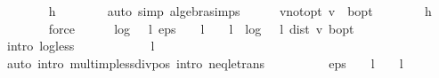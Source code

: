 \begin{isabellebody}
\ \ \ \ \ \ \isamarkupfalse%
\ h\isanewline
\ \ \ \ \ \ \isamarkupfalse%
\ {\isacharparenleft}{\kern0pt}auto\ simp{\isacharcolon}{\kern0pt}\ algebra{\isacharunderscore}{\kern0pt}simps{\isacharparenright}{\kern0pt}\isanewline
\ \ \ \ \isamarkupfalse%
\ v{\isacharunderscore}{\kern0pt}not{\isacharunderscore}{\kern0pt}opt{\isacharcolon}{\kern0pt}\ {\isachardoublequoteopen}v\ {\isasymnoteq}\ {\isasymnu}\isactrlsub b{\isacharunderscore}{\kern0pt}opt{\isachardoublequoteclose}\isanewline
\ \ \ \ \ \ \isamarkupfalse%
\ h\isanewline
\ \ \ \ \ \ \isamarkupfalse%
\ force\isanewline
\ \ \ \ \isamarkupfalse%
\ {\isachardoublequoteopen}log\ {\isacharparenleft}{\kern0pt}{}\ {\isacharslash}{\kern0pt}\ l{\isacharparenright}{\kern0pt}\ {\isacharparenleft}{\kern0pt}eps\ {\isacharasterisk}{\kern0pt}\ {\isacharparenleft}{\kern0pt}{}\ {\isacharminus}{\kern0pt}\ l{\isacharparenright}{\kern0pt}\ {\isacharslash}{\kern0pt}\ {\isacharparenleft}{\kern0pt}{}\ {\isacharasterisk}{\kern0pt}\ l{\isacharparenright}{\kern0pt}{\isacharparenright}{\kern0pt}\ {\isacharless}{\kern0pt}\ log\ {\isacharparenleft}{\kern0pt}{}\ {\isacharslash}{\kern0pt}\ l{\isacharparenright}{\kern0pt}\ {\isacharparenleft}{\kern0pt}dist\ v\ {\isasymnu}\isactrlsub b{\isacharunderscore}{\kern0pt}opt{\isacharparenright}{\kern0pt}{\isachardoublequoteclose}\isanewline
\ \ \ \ \isamarkupfalse%
\ {\isacharparenleft}{\kern0pt}intro\ log{\isacharunderscore}{\kern0pt}less{\isacharparenright}{\kern0pt}\isanewline
\ \ \ \ \ \ \isamarkupfalse%
\ {\isachardoublequoteopen}{}\ {\isacharless}{\kern0pt}\ {}\ {\isacharslash}{\kern0pt}\ l{\isachardoublequoteclose}\isanewline
\ \ \ \ \ \ \ \ \isamarkupfalse%
\ {\isacharparenleft}{\kern0pt}auto\ intro{\isacharbang}{\kern0pt}{\isacharcolon}{\kern0pt}\ mult{\isacharunderscore}{\kern0pt}imp{\isacharunderscore}{\kern0pt}less{\isacharunderscore}{\kern0pt}div{\isacharunderscore}{\kern0pt}pos\ intro{\isacharcolon}{\kern0pt}\ neq{\isacharunderscore}{\kern0pt}le{\isacharunderscore}{\kern0pt}trans{\isacharparenright}{\kern0pt}\isanewline
\ \ \ \ \ \ \isamarkupfalse%
\ {\isachardoublequoteopen}{}\ {\isacharless}{\kern0pt}\ eps\ {\isacharasterisk}{\kern0pt}\ {\isacharparenleft}{\kern0pt}{}\ {\isacharminus}{\kern0pt}\ l{\isacharparenright}{\kern0pt}\ {\isacharslash}{\kern0pt}\ {\isacharparenleft}{\kern0pt}{}\ {\isacharasterisk}{\kern0pt}\ l{\isacharparenright}{\kern0pt}{\isachardoublequoteclose}\ \isanewline

\end{isabellebody}
